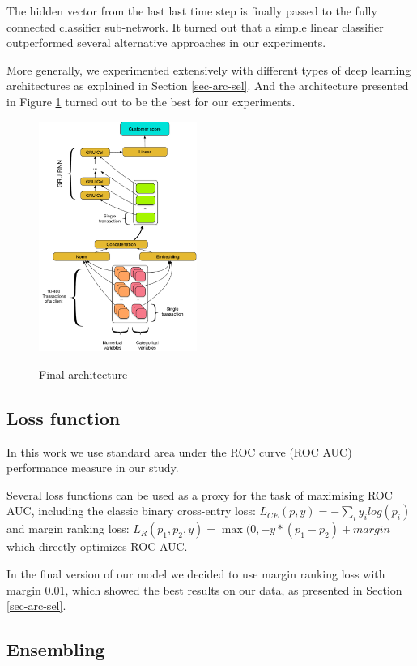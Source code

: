 \documentclass[sigconf]{acmart}
\begin{document}
The hidden vector from the last last time step is finally passed to the fully connected classifier sub-network.
It turned out that a simple linear classifier outperformed several alternative approaches in our experiments.

More generally, we experimented extensively with different types of deep learning architectures as explained in Section \ref{sec-arc-sel}. And the architecture presented in Figure \ref{fig-arch} turned out to be the best for our experiments.


\begin{figure}[ht]
  \caption{Final architecture}
  \includegraphics[width=0.46\textwidth]{figures/architecture.pdf}
  \label{fig-arch}
\end{figure}

\subsection{Loss function}

In this work we use standard area under the ROC curve (ROC AUC) performance measure in our study.

Several loss functions can be used as a proxy for the task of maximising ROC AUC, including the classic binary cross-entry loss: $L_{CE}(p, y) = - \sum_i y_ilog(p_i)$ and margin ranking loss: $ L_R(p_1, p_2, y) = \max(0, -y * (p_1 - p_2) + margin $ which directly optimizes ROC AUC.

In the final version of our model we decided to use margin ranking loss with margin 0.01, which showed the best results on our data, as presented in Section \ref{sec-arc-sel}.

\subsection{Ensembling}
\end{document}
